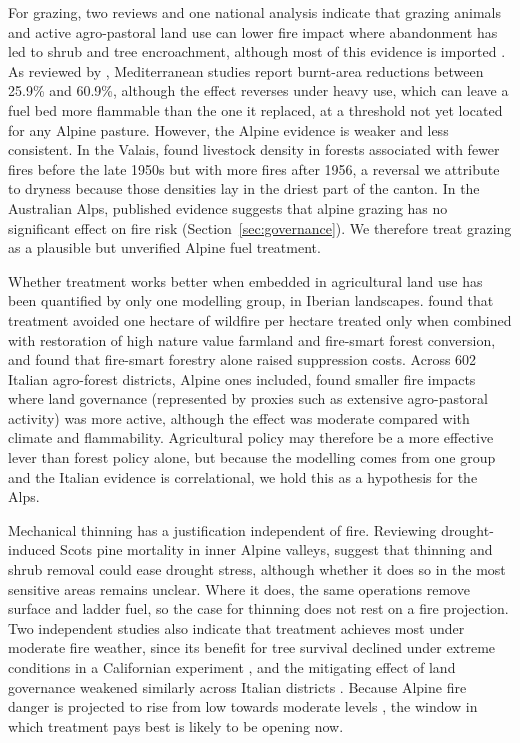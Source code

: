 \documentclass[11pt,a4paper]{article}
\begin{document}
For grazing, two reviews and one national analysis indicate that grazing animals and active agro-pastoral land use can lower fire impact where abandonment has led to shrub and tree encroachment, although most of this evidence is imported \citep{rouetleduc_effects_2021, xu_how_2026, spadoni_active_2023}. As reviewed by \citet{xu_how_2026}, Mediterranean studies report burnt-area reductions between 25.9\% and 60.9\%, although the effect reverses under heavy use, which can leave a fuel bed more flammable than the one it replaced, at a threshold not yet located for any Alpine pasture. However, the Alpine evidence is weaker and less consistent. In the Valais, \citet{zumbrunnen_human_2012} found livestock density in forests associated with fewer fires before the late 1950s but with more fires after 1956, a reversal we attribute to dryness because those densities lay in the driest part of the canton. In the Australian Alps, published evidence suggests that alpine grazing has no significant effect on fire risk (Section~\ref{sec:governance}). We therefore treat grazing as a plausible but unverified Alpine fuel treatment.

Whether treatment works better when embedded in agricultural land use has been quantified by only one modelling group, in Iberian landscapes. \citet{pais_optimizing_2023} found that treatment avoided one hectare of wildfire per hectare treated only when combined with restoration of high nature value farmland and fire-smart forest conversion, and \citet{lecinadiaz_incorporating_2023} found that fire-smart forestry alone raised suppression costs. Across 602 Italian agro-forest districts, Alpine ones included, \citet{spadoni_active_2023} found smaller fire impacts where land governance (represented by proxies such as extensive agro-pastoral activity) was more active, although the effect was moderate compared with climate and flammability. Agricultural policy may therefore be a more effective lever than forest policy alone, but because the modelling comes from one group and the Italian evidence is correlational, we hold this as a hypothesis for the Alps.

Mechanical thinning has a justification independent of fire. Reviewing drought-induced Scots pine mortality in inner Alpine valleys, \citet{giuggiola_droughtinduced_2010} suggest that thinning and shrub removal could ease drought stress, although whether it does so in the most sensitive areas remains unclear. Where it does, the same operations remove surface and ladder fuel, so the case for thinning does not rest on a fire projection. Two independent studies also indicate that treatment achieves most under moderate fire weather, since its benefit for tree survival declined under extreme conditions in a Californian experiment \citep{brodie_forest_2024}, and the mitigating effect of land governance weakened similarly across Italian districts \citep{spadoni_active_2023}. Because Alpine fire danger is projected to rise from low towards moderate levels \citep{gerberding_mapping_2025, miller_climate_2024}, the window in which treatment pays best is likely to be opening now.
\end{document}
